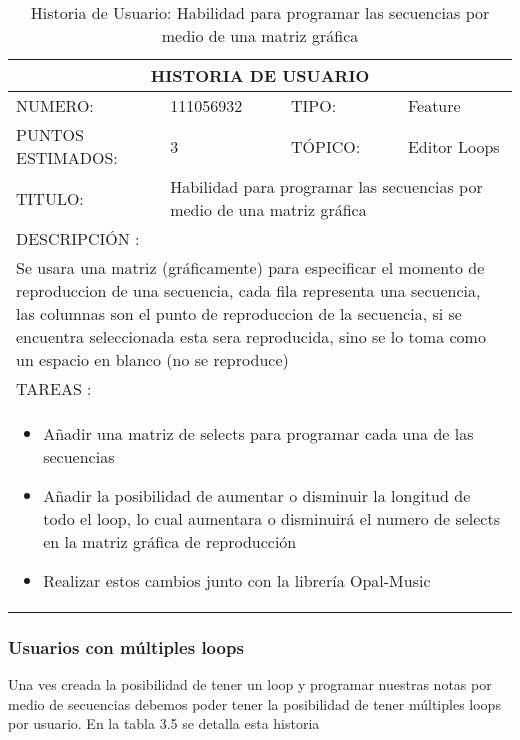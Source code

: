 \begin{table}[h]
\centering
\renewcommand{\arraystretch}{1.4}
\begin{tabular}{|*{4}{l|}}
\hline
\multicolumn{4}{|c|}{HISTORIA DE USUARIO} \\ \hline
NUMERO: & 111056932 & TIPO: & Feature \\ \hline
PUNTOS ESTIMADOS: & 3 & TÓPICO: & Editor Loops \\ \hline
TITULO: & \multicolumn{3}{|p{7.2cm}|}{Habilidad para programar las secuencias por medio de una matriz gráfica} \\ \hline
\multicolumn{4}{|l|}{DESCRIPCIÓN : } \\ \hline
\multicolumn{4}{|p{11cm}|}{Se usara una matriz (gráficamente) para especificar el momento de reproduccion de una secuencia, cada fila representa una secuencia, las columnas son el punto de reproduccion de la secuencia, si se encuentra seleccionada esta sera reproducida, sino se lo toma como un espacio en blanco (no se reproduce)} \\ \hline
\multicolumn{4}{|l|}{TAREAS : } \\ \hline
\multicolumn{4}{|p{11cm}|}{
\begin{minipage}[t]{\hsize}
  \begin{itemize}
    \item Añadir una matriz de selects para programar cada una de las secuencias
    \item Añadir la posibilidad de aumentar o disminuir la longitud de todo el loop, lo cual aumentara o disminuirá el numero de selects en la matriz gráfica de reproducción
    \item Realizar estos cambios junto con la librería Opal-Music
  \end{itemize}
\end{minipage}
} \\ \hline
\end{tabular}
\caption{Historia de Usuario: Habilidad para programar las secuencias por medio de una matriz gráfica}
\label{tab:Primero}
\end{table}

\subsubsection{Usuarios con múltiples loops}

Una ves creada la posibilidad de tener un loop y programar nuestras notas por
medio de secuencias debemos poder tener la posibilidad de tener múltiples loops
por usuario. En la tabla 3.5 se detalla esta historia

